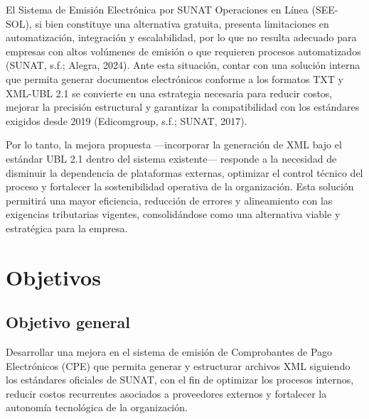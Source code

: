 \documentclass[12pt, a4paper]{article}
\begin{document}
El Sistema de Emisión Electrónica por SUNAT Operaciones en Línea (SEE-SOL), si bien constituye una alternativa gratuita, presenta limitaciones en automatización, integración y escalabilidad, por lo que no resulta adecuado para empresas con altos volúmenes de emisión o que requieren procesos automatizados (SUNAT, s.f.; Alegra, 2024). Ante esta situación, contar con una solución interna que permita generar documentos electrónicos conforme a los formatos TXT y XML-UBL 2.1 se convierte en una estrategia necesaria para reducir costos, mejorar la precisión estructural y garantizar la compatibilidad con los estándares exigidos desde 2019 (Edicomgroup, s.f.; SUNAT, 2017).

Por lo tanto, la mejora propuesta —incorporar la generación de XML bajo el estándar UBL 2.1 dentro del sistema existente— responde a la necesidad de disminuir la dependencia de plataformas externas, optimizar el control técnico del proceso y fortalecer la sostenibilidad operativa de la organización. Esta solución permitirá una mayor eficiencia, reducción de errores y alineamiento con las exigencias tributarias vigentes, consolidándose como una alternativa viable y estratégica para la empresa.

\section{Objetivos}

\subsection{Objetivo general}
Desarrollar una mejora en el sistema de emisión de Comprobantes de Pago Electrónicos (CPE) que permita generar y estructurar archivos XML siguiendo los estándares oficiales de SUNAT, con el fin de optimizar los procesos internos, reducir costos recurrentes asociados a proveedores externos y fortalecer la autonomía tecnológica de la organización.
\end{document}
